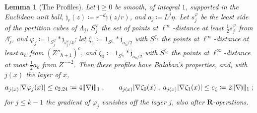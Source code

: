 \documentclass[11pt]{preprint}
\DeclarePairedDelimiter{\abs}{\lvert}{\rvert}
\DeclarePairedDelimiter{\norm}{\lVert}{\rVert}
\numberwithin{equation}{section}
\newtheorem{lemma}{Lemma}[section]
\theoremstyle{definition}
\theoremstyle{remark}
\theoremstyle{plain}
\begin{document}
\begin{lemma}[The Profiles]\label{lem:coupling-profiles}
Let $\mathfrak j \geq 0$ be smooth, of integral $1$, supported in the Euclidean unit ball, $\mathfrak j_r(z) \coloneqq r^{-d}\mathfrak j(z/r)$, and $a_j \coloneqq L^j\eta$. Let $s^\varphi_j$ be the least side of the partition cubes of $\Lambda_j$, $S^\varphi_j$ the set of points at $\ell^\infty$-distance at least $\frac12s^\varphi_j$ from $\Lambda_j^c$, and $\varphi_j \coloneqq 1_{S^\varphi_j} * \mathfrak j_{s^\varphi_j/4}$; let $\zeta_1 \coloneqq 1_{S^{\zeta_1}} * \mathfrak j_{a_h/2}$ with $S^{\zeta_1}$ the points at $\ell^\infty$-distance at least $a_h$ from $(Z''_{h+1})^c$, and $\zeta_0 \coloneqq 1_{S^{\zeta_0}} * \mathfrak j_{a_k/2}$ with $S^{\zeta_0}$ the points at $\ell^\infty$-distance at most $\frac12a_k$ from $Z^{\sim-2}$. Then these profiles have Ba{\l}aban's properties, and, with $j(x)$ the layer of $x$,
\begin{equation}\label{eq:profile-gradients}
    a_{j(x)}\abs{\nabla\varphi_j(x)} \leq c_{2.24} \coloneqq 4\norm{\nabla\mathfrak j}_1\;,
    \qquad
    a_{j(x)}\abs{\nabla\zeta_0(x)},\; a_{j(x)}\abs{\nabla\zeta_1(x)} \leq c_\zeta \coloneqq 2\norm{\nabla\mathfrak j}_1\;;
\end{equation}
for $j \leq k - 1$ the gradient of $\varphi_j$ vanishes off the layer $j$, also after $\mathbf R$-operations.
\end{lemma}
\end{document}
